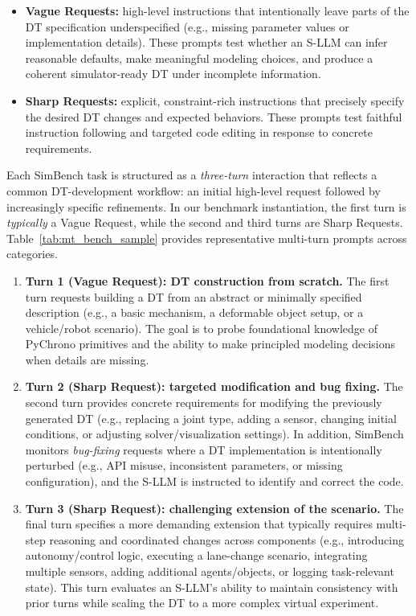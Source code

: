 \documentclass{ieeeaccess}
\begin{document}
\begin{itemize}
    \item \textbf{Vague Requests:} high-level instructions that intentionally leave parts of the DT specification underspecified (e.g., missing parameter values or implementation details). These prompts test whether an S-LLM can infer reasonable defaults, make meaningful modeling choices, and produce a coherent simulator-ready DT under incomplete information.
    \item \textbf{Sharp Requests:} explicit, constraint-rich instructions that precisely specify the desired DT changes and expected behaviors. These prompts test faithful instruction following and targeted code editing in response to concrete requirements.
\end{itemize}

Each SimBench task is structured as a \emph{three-turn} interaction that reflects a common DT-development workflow: an initial high-level request followed by increasingly specific refinements. In our benchmark instantiation, the first turn is \emph{typically} a Vague Request, while the second and third turns are Sharp Requests.
Table~\ref{tab:mt_bench_sample} provides representative multi-turn prompts across categories.

\begin{enumerate}
    \item \textbf{Turn 1 (Vague Request): DT construction from scratch.}
    The first turn requests building a DT from an abstract or minimally specified description (e.g., a basic mechanism, a deformable object setup, or a vehicle/robot scenario). The goal is to probe foundational knowledge of PyChrono primitives and the ability to make principled modeling decisions when details are missing.

    \item \textbf{Turn 2 (Sharp Request): targeted modification and bug fixing.}
    The second turn provides concrete requirements for modifying the previously generated DT (e.g., replacing a joint type, adding a sensor, changing initial conditions, or adjusting solver/visualization settings). In addition, SimBench monitors \emph{bug-fixing} requests where a DT implementation is intentionally perturbed (e.g., API misuse, inconsistent parameters, or missing configuration), and the S-LLM is instructed to identify and correct the code.

    \item \textbf{Turn 3 (Sharp Request): challenging extension of the scenario.}
    The final turn specifies a more demanding extension that typically requires multi-step reasoning and coordinated changes across components (e.g., introducing autonomy/control logic, executing a lane-change scenario, integrating multiple sensors, adding additional agents/objects, or logging task-relevant state). This turn evaluates an S-LLM’s ability to maintain consistency with prior turns while scaling the DT to a more complex virtual experiment.
\end{enumerate}
\end{document}
